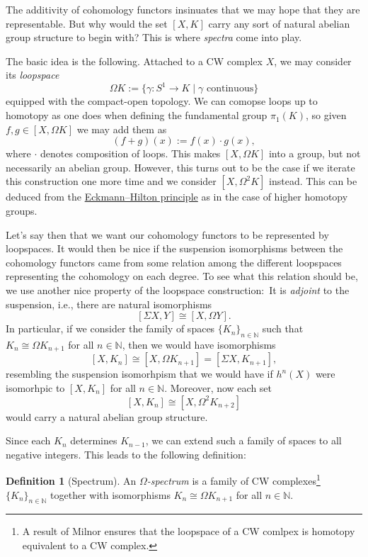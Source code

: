 \documentclass[12pt,a4paper]{amsart}
\theoremstyle{plain}
\theoremstyle{definition}
\newtheorem{defn}[thm]{Definition}
\theoremstyle{remark}
\begin{document}
The additivity of cohomology functors insinuates that we may hope that they are representable.
But why would the set $[X,K]$ carry any sort of natural abelian group structure to begin with?
This is where \emph{spectra} come into play.

The basic idea is the following.
Attached to a CW complex $X$, we may consider its \emph{loopspace}
\[ \Omega K := \{ \gamma \colon S^{1} \to K \mid \gamma \text{ continuous} \} \]
equipped with the compact-open topology.
We can comopse loops up to homotopy as one does when defining the fundamental group $\pi_{1}(K)$, so given $f,g \in [X, \Omega K]$ we may add them as
\[ (f + g)(x) := f(x) \cdot g(x), \]
where $\cdot$ denotes composition of loops.
This makes $[X,\Omega K]$ into a group, but not necessarily an abelian group.
However, this turns out to be the case if we iterate this construction one more time and we consider $[X, \Omega^{2} K]$ instead.
This can be deduced from the \href{https://en.wikipedia.org/wiki/Eckmann\%E2\%80\%93Hilton_argument}{Eckmann--Hilton principle} as in the case of higher homotopy groups.

Let's say then that we want our cohomology functors to be represented by loopspaces.
It would then be nice if the suspension isomorphisms between the cohomology functors came from some relation among the different loopspaces representing the cohomology on each degree.
To see what this relation should be, we use another nice property of the loopspace construction:~It is \emph{adjoint} to the suspension, i.e., there are natural isomorphisms
\[ [\Sigma X, Y] \cong [X, \Omega Y]. \]
In particular, if we consider the family of spaces $\{ K_{n} \}_{n \in \mathbb{N}}$ such that $K_{n} \cong \Omega K_{n+1}$ for all $n \in \mathbb{N}$, then we would have isomorphisms
\[ [ X, K_{n}] \cong [ X, \Omega K_{n+1}] = [ \Sigma X,  K_{n+1}], \]
resembling the suspension isomorhpism that we would have if $h^{n}(X)$ were isomorhpic to $[X,K_{n}]$ for all $n \in \mathbb{N}$.
Moreover, now each set
\[ [X, K_{n}] \cong [X, \Omega^{2} K_{n+2}] \]
would carry a natural abelian group structure.

Since each $K_{n}$ determines $K_{n-1}$, we can extend such a family of spaces to all negative integers.
This leads to the following definition:

\begin{defn}[Spectrum]
  An \emph{$\Omega$-spectrum} is a family of CW complexes\footnote{A result of Milnor ensures that the loopspace of a CW comlpex is homotopy equivalent to a CW complex.} $\{K_{n}\}_{n \in \mathbb{N}}$ together with isomorphisms $K_{n} \cong \Omega K_{n+1}$ for all $n \in \mathbb{N}$.
\end{defn}
\end{document}
